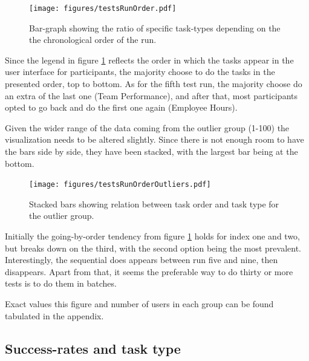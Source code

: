 \documentclass[nofilelist,dvipsnames]{cslthse-msc}
\begin{document}
				\begin{figure}[ht!]
					\centering
					\texttt{[image: figures/testsRunOrder.pdf]}
          \caption{
            Bar-graph showing the ratio of specific task-types depending on the
            the chronological order of the run.
          }
          \label{label_testsRunOrder}
        \end{figure}

        Since the legend in figure \ref{label_testsRunOrder} reflects the order
        in which the tasks appear in the user interface for participants, the
        majority choose to do the tasks in the presented order, top to bottom.
        As for the fifth test run, the majority choose do an extra of the last
        one (Team Performance), and after that, most participants opted to go
        back and do the first one again (Employee Hours).

        Given the wider range of the data coming from the outlier group (1-100)
        the visualization needs to be altered slightly. Since there is not
        enough room to have the bars side by side, they have been stacked, with
        the largest bar being at the bottom.
				\begin{figure}[ht!]
					\centering
					\texttt{[image: figures/testsRunOrderOutliers.pdf]}
          \caption{
            Stacked bars showing relation between task order and task type for
            the outlier group.
          }
				\end{figure}

        Initially the going-by-order tendency from figure
        \ref{label_testsRunOrder} holds for index one and two, but breaks down
        on the third, with the second option being the most prevalent.
        Interestingly, the sequential does appears between run five and nine,
        then disappears. Apart from that, it seems the preferable way to do
        thirty or more tests is to do them in batches.

        Exact values this figure and number of users in each group can be found
        tabulated in the appendix. 

%

      \subsection{Success-rates and task type}
\end{document}
